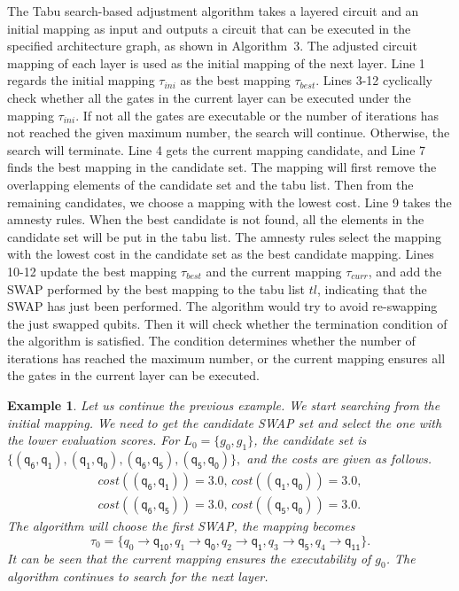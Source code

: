 \documentclass[journal]{IEEEtran}
\newtheorem{example}{Example}
\begin{document}
	The Tabu search-based adjustment algorithm takes a layered circuit and an initial mapping as input and outputs a circuit that can be executed in the specified architecture graph, as shown in Algorithm~3. %
	The adjusted circuit mapping of each layer is used as the initial mapping of the next layer. 
	Line 1 regards the initial mapping $\tau_{ini}$ as the best mapping $\tau_{best}$. Lines 3-12 cyclically check whether all the gates in the current layer can be executed under the mapping $\tau_{ini}$. If not all the gates are executable or the number of iterations has not reached the given maximum number, the search will continue. Otherwise, the search will terminate. Line 4 gets the current mapping candidate, and Line 7 finds the best mapping in the candidate set. The mapping will first remove the overlapping elements of the candidate set and the tabu list. Then from the remaining candidates, we choose a mapping with the lowest cost. Line 9 takes the amnesty rules. When the best candidate is not found, all the elements in the candidate set will be put in the tabu list.  The amnesty rules select the mapping with the lowest cost in the candidate set as the best candidate mapping. Lines 10-12 update the best mapping $\tau_{best}$ and the current mapping $\tau_{curr}$, and add the SWAP performed by the best mapping to the tabu list $tl$, indicating that the SWAP has just been performed. 
	The algorithm would try to avoid re-swapping the just swapped qubits. Then it will check whether the termination condition of the algorithm is satisfied. The condition determines whether the number of iterations has reached the maximum number, or the current mapping ensures all the gates in the current layer can be executed. 
\begin{example}
Let us continue the previous example. We start searching from the initial mapping. We need to get the candidate SWAP set and select the one with the lower evaluation scores.
For $L_{0}=\{g_{0},g_{1}\}$, the candidate set is 
$\{(\textsf{q}_\textsf{6},\textsf{q}_\textsf{1}), (\textsf{q}_\textsf{1},\textsf{q}_\textsf{0}), (\textsf{q}_\textsf{6},\textsf{q}_\textsf{5}), (\textsf{q}_\textsf{5},\textsf{q}_\textsf{0}) \} , $ and the costs are given as follows.
\[\begin{array}{l}
cost((\textsf{q}_\textsf{6},\textsf{q}_\textsf{1}))=3.0, \, cost((\textsf{q}_\textsf{1},\textsf{q}_\textsf{0}))=3.0,\\ cost((\textsf{q}_\textsf{6},\textsf{q}_\textsf{5}))=3.0, \, cost((\textsf{q}_\textsf{5},\textsf{q}_\textsf{0}))=3.0 .
\end{array}\]
The algorithm will choose the first SWAP, the mapping becomes $$\tau_{0}=\{\textit{q}_\textit{0}\rightarrow  \textsf{q}_\textsf{10},\textit{q}_\textit{1}\rightarrow  \textsf{q}_\textsf{0},
\textit{q}_\textit{2}\rightarrow  \textsf{q}_\textsf{1},\textit{q}_\textit{3}\rightarrow  \textsf{q}_\textsf{5},\textit{q}_\textit{4}\rightarrow  \textsf{q}_\textsf{11}\} . $$ 
 It can be seen that the current mapping ensures the executability of $g_{0}$. The algorithm continues to search for the next layer.
\end{example}
\end{document}
